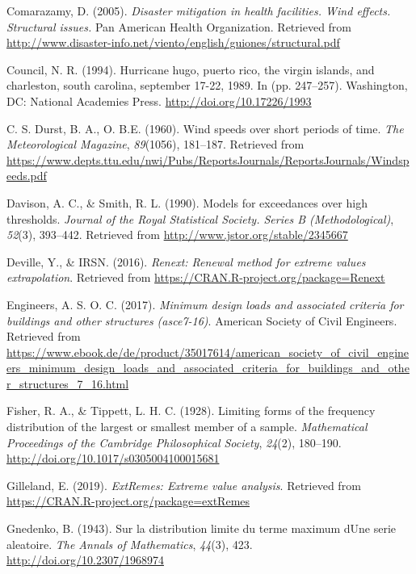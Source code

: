 \documentclass[12pt,oneside]{reedthesis}
\begin{document}
\leavevmode\hypertarget{ref-windeffects}{}%
Comarazamy, D. (2005). \emph{Disaster mitigation in health facilities. Wind effects. Structural issues.} Pan American Health Organization. Retrieved from \url{http://www.disaster-info.net/viento/english/guiones/structural.pdf}

\leavevmode\hypertarget{ref-winddamage}{}%
Council, N. R. (1994). Hurricane hugo, puerto rico, the virgin islands, and charleston, south carolina, september 17-22, 1989. In (pp. 247--257). Washington, DC: National Academies Press. \url{http://doi.org/10.17226/1993}

\leavevmode\hypertarget{ref-Durst1960}{}%
C. S. Durst, B. A., O. B.E. (1960). Wind speeds over short periods of time. \emph{The Meteorological Magazine}, \emph{89}(1056), 181--187. Retrieved from \url{https://www.depts.ttu.edu/nwi/Pubs/ReportsJournals/ReportsJournals/Windspeeds.pdf}

\leavevmode\hypertarget{ref-Davison1990}{}%
Davison, A. C., \& Smith, R. L. (1990). Models for exceedances over high thresholds. \emph{Journal of the Royal Statistical Society. Series B (Methodological)}, \emph{52}(3), 393--442. Retrieved from \url{http://www.jstor.org/stable/2345667}

\leavevmode\hypertarget{ref-Deville2016}{}%
Deville, Y., \& IRSN. (2016). \emph{Renext: Renewal method for extreme values extrapolation}. Retrieved from \url{https://CRAN.R-project.org/package=Renext}

\leavevmode\hypertarget{ref-Asce2017}{}%
Engineers, A. S. O. C. (2017). \emph{Minimum design loads and associated criteria for buildings and other structures (asce7-16)}. American Society of Civil Engineers. Retrieved from \url{https://www.ebook.de/de/product/35017614/american_society_of_civil_engineers_minimum_design_loads_and_associated_criteria_for_buildings_and_other_structures_7_16.html}

\leavevmode\hypertarget{ref-Fisher1928}{}%
Fisher, R. A., \& Tippett, L. H. C. (1928). Limiting forms of the frequency distribution of the largest or smallest member of a sample. \emph{Mathematical Proceedings of the Cambridge Philosophical Society}, \emph{24}(2), 180--190. \url{http://doi.org/10.1017/s0305004100015681}

\leavevmode\hypertarget{ref-Gilleland2019}{}%
Gilleland, E. (2019). \emph{ExtRemes: Extreme value analysis}. Retrieved from \url{https://CRAN.R-project.org/package=extRemes}

\leavevmode\hypertarget{ref-Gnedenko1943}{}%
Gnedenko, B. (1943). Sur la distribution limite du terme maximum dUne serie aleatoire. \emph{The Annals of Mathematics}, \emph{44}(3), 423. \url{http://doi.org/10.2307/1968974}
\end{document}

